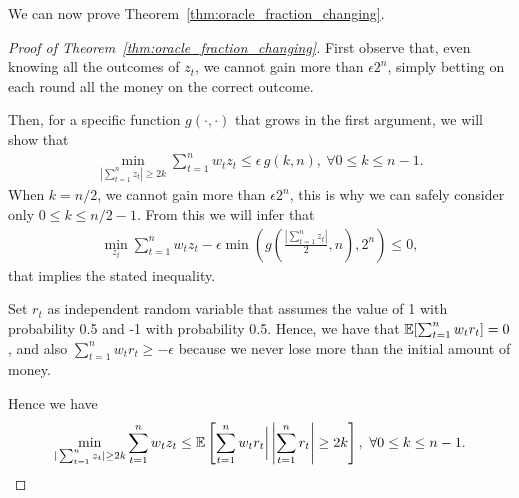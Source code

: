 We can now prove Theorem~\ref{thm:oracle_fraction_changing}.

\begin{proof}[Proof of Theorem~\ref{thm:oracle_fraction_changing}]
First observe that, even knowing all the outcomes of $z_t$, we cannot gain more than $\epsilon 2^n$, simply betting on each round all the money on the correct outcome.

Then, for a specific function $g(\cdot,\cdot)$ that grows in the first argument, we will show that
\begin{align*}
\min_{|\sum_{t=1}^n z_t| \geq 2 k} \sum_{t=1}^n w_t z_t 
\leq \epsilon \, g(k,n), \ \forall 0 \leq k \leq n-1.
\end{align*}
When $k=n/2$, we cannot gain more than $\epsilon 2^n$, this is why we can safely consider only $0\leq k\leq n/2-1$.
From this we will infer that
\begin{align*}
\min_{z_t} \sum_{t=1}^n w_t z_t - \epsilon\min\left(g\left(\frac{|\sum_{t=1}^n z_t|}{2},n\right),2^n\right) \leq 0,
\end{align*}
that implies the stated inequality.

Set $r_t$ as independent random variable that assumes the value of 1 with probability 0.5 and -1 with probability 0.5.
Hence, we have that $\mathbb{E}[ \sum_{t=1}^n w_t r_t ]=0$, and also $\sum_{t=1}^n w_t r_t \geq -\epsilon$ because we never lose more than the initial amount of money.

Hence we have
\begin{align*}
\min_{|\sum_{t=1}^n z_t| \geq 2 k} \sum_{t=1}^n w_t z_t 
\leq \mathbb{E}\left[\sum_{t=1}^n w_t r_t \bigg| \left|\sum_{t=1}^n r_t\right| \geq 2 k\right], \ \forall 0 \leq k \leq n-1.
\end{align*}


\end{proof}
